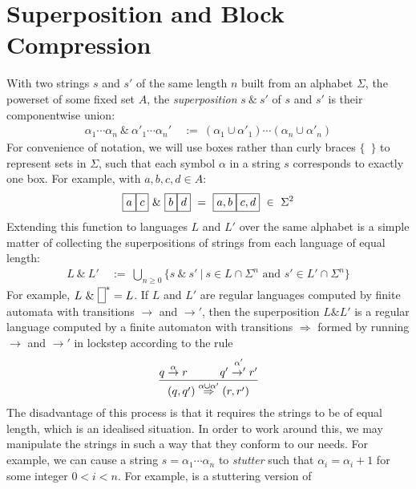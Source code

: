 \documentclass[a4paper,11pt]{article}
\newcommand{\vph}[1]{\vphantom{#1}}
\newcommand{\sta}[2]{\stackrel{#1}{#2}}
\begin{document}
\section{Superposition and Block Compression}
With two strings $s$ and $s'$ of the same length $n$
built from an alphabet $\Sigma$, the powerset of some fixed set $A$,
the \textit{superposition} $s ~\&~ s'$ of $s$ and $s'$ is their componentwise 
union:
\begin{align*}
\alpha_1\cdots\alpha_n \ \&\ 
\alpha'_1\cdots\alpha_n' & \ :=\
(\alpha_1\cup\alpha'_1)\cdots(\alpha_n\cup\alpha'_n)
\end{align*}
For convenience of notation, we will use boxes rather than curly braces 
$\{$~$\}$ to represent sets in $\Sigma$, such that each symbol $\alpha$ in a 
string $s$ corresponds to exactly one box. For example, with $a, b, c, d \in A$:
\begin{align*}
\fbox{$a\vph{,'}$}\fbox{$c\vph{,'}$} \ \& \ 
\fbox{$b\vph{,'}$}\fbox{$d\vph{,'}$} \ = \
\fbox{$a, b\vph{,'}$}\fbox{$c, d\vph{,'}$} \ \in\ \Sigma^2
\end{align*}
Extending this function to languages $L$ and $L'$ over the same alphabet is a 
simple matter of 
collecting the superpositions of strings from each language of equal length: 
\begin{align*}
L ~\&~ L' & \ :=\ \bigcup_{n\geq 0}
\{s~\&~s'\ | \ s\in L\cap \Sigma^n\mbox{ and }s'\in L'\cap \Sigma^n\}
\end{align*}
For example, $L ~\&~ \fbox{\vph{'}}^\ast = L$.
If $L$ and $L'$ are regular languages computed by finite automata
with transitions $\to$ and $\to'$, then the superposition $L\& L'$ is
a regular language computed by a finite automaton with transitions
$\Rightarrow$
formed by running $\to$ and $\to'$ in lockstep
according to the rule 
\begin{align*}
\frac{q \sta{\alpha}{\to} r   \hspace{.4in} q' \sta{\alpha'}{\to'} r'}{
	(q,q') \sta{\alpha\cup\alpha'}{\Rightarrow} (r,r')}
\end{align*}
The disadvantage of this process is that it requires the strings to be of equal 
length, which is an idealised situation. In order to work around this, we may 
manipulate the strings in such a way that they conform to our needs. For 
example, we 
can cause a string $s=\alpha_1\cdots\alpha_n$ to \textit{stutter} such that 
$\alpha_i=\alpha_i+1$ for some integer $0 < i < n$. For example, 
\fbox{$a\vph{'}$}\fbox{$a\vph{'}$}\fbox{$a\vph{'}$}\fbox{$c\vph{'}$}\fbox{$c\vph{'}$}
 is a stuttering version of 
\end{document}
